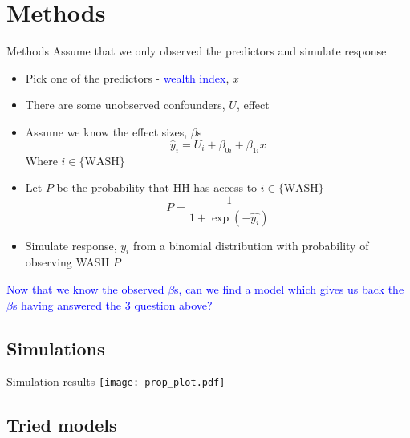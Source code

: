 \documentclass{beamer}
\begin{document}
\section{Methods}
\begin{frame}{Methods}
Assume that we only observed the predictors and simulate response
\begin{itemize}[<+->]
\item Pick one of the predictors - \textcolor{blue}{wealth index}, $x$
\item There are some unobserved confounders, $U$, effect
\item Assume we know the effect sizes, $\beta$s
\pause
\[
\hat{y}_i = U_i + \beta_{0i} + \beta_{1i}x
\]
Where $i\in\{\text{WASH}\}$
\item Let $P$ be the probability that HH has access to $i\in\{\text{WASH}\}$
\[
P = \frac{1}{1 + \exp{(-\hat{y_i})}}
\]
\item Simulate response, $y_i$ from a binomial distribution with probability of observing WASH $P$
\end{itemize}
\pause
\textcolor{blue}{Now that we know the observed $\beta$s, can we find a model which gives us back the $\beta$s having answered the 3 question above?}
\end{frame}

\subsection{Simulations}
\begin{frame}{Simulation results}
\centering
\texttt{[image: prop\_plot.pdf]}
\end{frame}

\subsection{Tried models}
\end{document}
